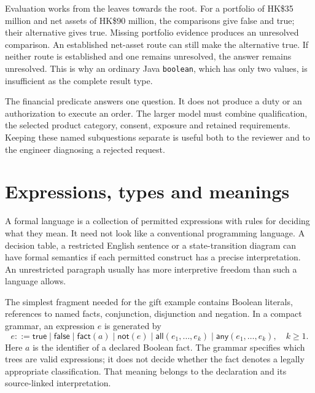 \documentclass[12pt,a4paper,oneside,openany]{book}
\begin{document}
Evaluation works from the leaves towards the root. For a portfolio of HK\$35
million and net assets of HK\$90 million, the comparisons give false and true;
their alternative gives true. Missing portfolio evidence produces an unresolved
comparison. An established net-asset route can still make the alternative true.
If neither route is established and one remains unresolved, the answer remains
unresolved. This is why an ordinary Java \texttt{boolean}, which has only two
values, is insufficient as the complete result type.

The financial predicate answers one question. It does not produce a duty or an
authorization to execute an order. The larger model must combine qualification,
the selected product category, consent, exposure and retained requirements.
Keeping these named subquestions separate is useful both to the reviewer and
to the engineer diagnosing a rejected request.

\section{Expressions, types and meanings}
\label{merge:M03:04}

\label{sec:proof-language}
A formal language is a collection of permitted expressions with rules for
deciding what they mean. It need not look like a conventional programming
language. A decision table, a restricted English sentence or a state-transition
diagram can have formal semantics if each permitted construct has a precise
interpretation. An unrestricted paragraph usually has more interpretive freedom
than such a language allows.

The simplest fragment needed for the gift example contains Boolean literals,
references to named facts, conjunction, disjunction and negation. In a compact
grammar, an expression $e$ is generated by
\begin{equation}
 e ::= \mathsf{true}\mid\mathsf{false}\mid\mathsf{fact}(a)
       \mid\mathsf{not}(e)\mid\mathsf{all}(e_1,\ldots,e_k)
       \mid\mathsf{any}(e_1,\ldots,e_k),\quad k\geq 1.
 \label{eq:boolean-grammar}
\end{equation}
Here $a$ is the identifier of a declared Boolean fact. The grammar specifies
which trees are valid expressions; it does not decide whether the fact denotes
a legally appropriate classification. That meaning belongs to the declaration
and its source-linked interpretation.
\end{document}
